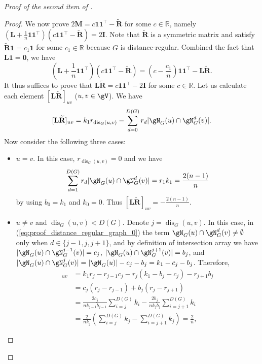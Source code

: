 \documentclass{article} %
\let\cref\crtcref
\newcommand*{\dis}{{\operatorname{dis}}}
\begin{document}
\begin{proof}[Proof of the second item of \cref{thm:distance_regular}]
\begin{proof}
We now prove $2\mathbf M=c\mathbf 1\mathbf 1^\top-\widetilde {\mathbf R}$ for some $c\in\mathbb R$, namely $\left(\mathbf L+\frac 1 n \mathbf 1\mathbf 1^\top\right)\left(c\mathbf 1\mathbf 1^\top-\widetilde {\mathbf R}\right)=2\mathbf I$. Note that $\widetilde{\mathbf R}$ is a symmetric matrix and satisfy $\widetilde{\mathbf R}\mathbf 1=c_1\mathbf 1$ for some $c_1\in\mathbb R$ because $G$ is distance-regular. Combined the fact that $\mathbf L\mathbf 1=\mathbf 0$, we have
$$\left(\mathbf L+\frac 1 n \mathbf 1\mathbf 1^\top\right)\left(c\mathbf 1\mathbf 1^\top-\widetilde {\mathbf R}\right)=\left(c-\frac {c_1} n\right)\mathbf 1\mathbf 1^\top-\mathbf L\widetilde {\mathbf R}.$$
It thus suffices to prove that $\mathbf L\widetilde {\mathbf R}=c\mathbf 1\mathbf 1^\top-2\mathbf I$ for some $c\in\mathbb R$. Let us calculate each element $[\mathbf L\widetilde {\mathbf R}]_{uv}$ ($u,v\in\gV$). We have 
\begin{equation}
\label{eq:proof_distance_regular_graph_0}
    [\mathbf L\widetilde {\mathbf R}]_{uv}=k_1 r_{\dis_G(u,v)}-\sum_{d=0}^{D(G)} r_{d}|\gN_G(u)\cap\gN^d_G(v)|.
\end{equation}
Now consider the following three cases:
\begin{itemize}[topsep=0pt,leftmargin=30pt]
    \setlength{\itemsep}{0pt}
    \item $u=v$. In this case, $r_{\dis_G(u,v)}=0$ and we have $$\sum_{d=1}^{D(G)} r_{d}|\gN_G(u)\cap\gN^d_G(v)|=r_1 k_1=\frac {2(n-1)} n$$ by using $b_0=k_1$ and $k_0=0$. Thus $[\mathbf L\widetilde {\mathbf R}]_{uv}=-\frac {2(n-1)} n$.
    \item $u\neq v$ and $\dis_G(u,v)<D(G)$. Denote $j=\dis_G(u,v)$. In this case, in (\ref{eq:proof_distance_regular_graph_0}) the term $\gN_G(u)\cap\gN^d_G(v)\neq\emptyset$ only when $d\in\{j-1,j,j+1\}$, and by definition of intersection array we have $|\gN_G(u)\cap\gN^{j-1}_G(v)|=c_j$, $|\gN_G(u)\cap\gN^{j+1}_G(v)|=b_j$, and $|\gN_G(u)\cap\gN^{j}_G(v)|=|\gN_G(u)|-c_j-b_j=k_1-c_j-b_j$. Therefore,
    \begin{align*}
        [\mathbf L\widetilde {\mathbf R}]_{uv}&=k_1 r_{j}- r_{j-1}c_j-r_{j}(k_1-b_j-c_j)-r_{j+1}b_j\\
        &=c_j(r_j-r_{j-1})+b_j(r_j-r_{j+1})\\
        &=\frac {2c_j} {n k_{j-1}b_{j-1}}\sum_{i=j}^{D(G)}k_i-\frac {2b_j} {n k_{j}b_{j}}\sum_{i=j+1}^{D(G)}k_i\\
        &=\frac 2 {nk_j}\left(\sum_{i=j}^{D(G)}k_j-\sum_{i=j+1}^{D(G)}k_j\right)=\frac 2 n,
    \end{align*}

\end{itemize}
\end{proof}
\end{proof}
\end{document}
